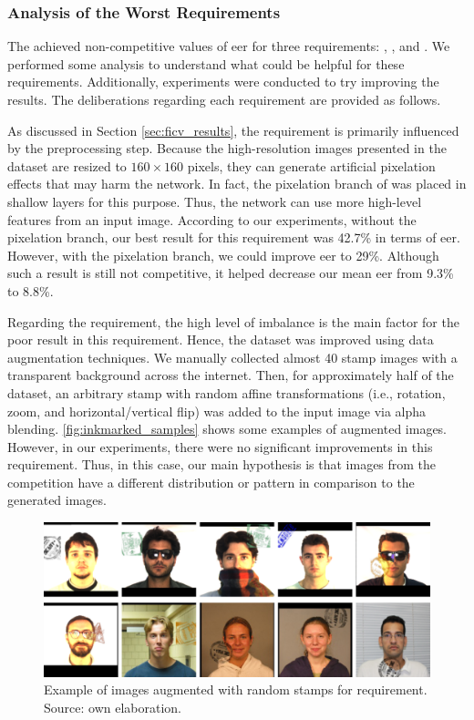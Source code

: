 

\subsubsection{Analysis of the Worst Requirements}

The \methodname achieved non-competitive values of \acs{eer} for three requirements: \inkmarked, \pixelation, and \otherfacesortoys. We performed some analysis to understand what could be helpful for these requirements. Additionally, experiments were conducted to try improving the results. The deliberations regarding each requirement are provided as follows.

As discussed in Section \ref{sec:ficv_results}, the \pixelation requirement is primarily influenced by the preprocessing step. Because the high-resolution images presented in the dataset are resized to $160 \times 160$ pixels, they can generate artificial pixelation effects that may harm the network. In fact, the pixelation branch of \methodname was placed in shallow layers for this purpose. Thus, the network can use more high-level features from an input image. According to our experiments, without the pixelation branch, our best result for this requirement was 42.7\% in terms of \acs{eer}. However, with the pixelation branch, we could improve \acs{eer} to 29\%. Although such a result is still not competitive, it helped decrease our mean \acs{eer} from 9.3\% to 8.8\%.

Regarding the \inkmarked requirement, the high level of imbalance is the main factor for the poor result in this requirement. Hence, the dataset was improved using data augmentation techniques. We manually collected almost 40 stamp images with a transparent background across the internet. Then, for approximately half of the dataset, an arbitrary stamp with random affine transformations (i.e., rotation, zoom, and horizontal/vertical flip) was added to the input image via alpha blending. \autoref{fig:inkmarked_samples} shows some examples of augmented images. However, in our experiments, there were no significant improvements in this requirement. Thus, in this case, our main hypothesis is that images from the competition have a different distribution or pattern in comparison to the generated images.

\begin{figure}[htb]
\centering
\includegraphics[width=\linewidth]{images/inkmarked/inkmarked_samples.pdf}
\caption{Example of images augmented with random stamps for \inkmarked requirement. Source: own elaboration.}
\label{fig:inkmarked_samples}
\end{figure}

